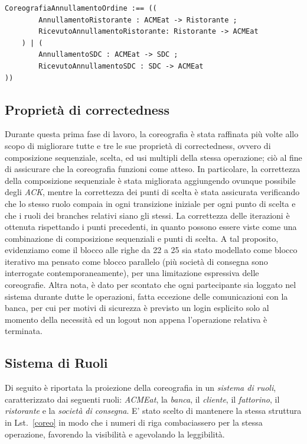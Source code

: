 \documentclass[11pt]{article} %
\begin{document}
\begin{lstlisting}[label=coreo,caption=Coreografia dello scenario di utilizzo di ACMEat]
CoreografiaAnnullamentoOrdine :== ((
		AnnullamentoRistorante : ACMEat -> Ristorante ;
		RicevutoAnnullamentoRistorante: Ristorante -> ACMEat
	) | ( 
		AnnullamentoSDC : ACMEat -> SDC ;
		RicevutoAnnullamentoSDC : SDC -> ACMEat
))
\end{lstlisting}

\subsection{Proprietà di correctedness}

Durante questa prima fase di lavoro, la coreografia è stata raffinata più volte allo scopo di migliorare tutte e tre le sue proprietà di correctedness, ovvero di composizione sequenziale, scelta, ed usi multipli della stessa operazione; ciò al fine di assicurare che la coreografia funzioni come atteso. In particolare, la correttezza della composizione sequenziale è stata migliorata aggiungendo ovunque possibile degli \emph{ACK}, mentre la correttezza dei punti di scelta è stata assicurata verificando che lo stesso ruolo compaia in ogni transizione iniziale per ogni punto di scelta e che i ruoli dei branches relativi siano gli stessi. La correttezza delle iterazioni è ottenuta rispettando i punti precedenti, in quanto possono essere viste come una combinazione di composizione sequenziali e punti di scelta. A tal proposito, evidenziamo come il blocco alle righe da 22 a 25 sia stato modellato come blocco iterativo ma pensato come blocco parallelo (più società di consegna sono interrogate contemporaneamente), per una limitazione espressiva delle coreografie. Altra nota, è dato per scontato che ogni partecipante sia loggato nel sistema durante dutte le operazioni, fatta eccezione delle comunicazioni con la banca, per cui per motivi di sicurezza è previsto un login esplicito solo al momento della necessità ed un logout non appena l'operazione relativa è terminata.

\subsection{Sistema di Ruoli}
\label{sdr}

Di seguito è riportata la proiezione della coreografia in un \emph{sistema di ruoli}, caratterizzato dai seguenti ruoli: \emph{ACMEat}, la \emph{banca}, il \emph{cliente}, il \emph{fattorino}, il \emph{ristorante} e la \emph{società di consegna}. E' stato scelto di mantenere la stessa struttura in Lst.~\ref{coreo} in modo che i numeri di riga combaciassero per la stessa operazione, favorendo la visibilità e agevolando la leggibilità. 
\end{document}
